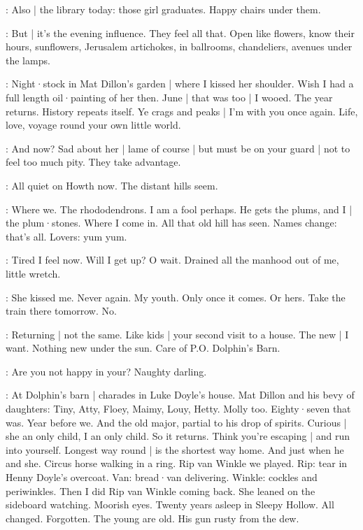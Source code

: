 \BloomToday:
Also |
the library today:
those girl graduates.
Happy chairs under them.

\BloomAbstract:
But |
it's the evening influence.
They feel all that.
Open like flowers,
know their hours,
sunflowers,
Jerusalem artichokes,
in ballrooms,
chandeliers,
avenues under the lamps.%

\BloomHist:
Night·stock in Mat Dillon's garden |
where I kissed her shoulder.
Wish I had a full length oil·painting of her then.
June |
that was too |
I wooed.
The year returns.
History repeats itself.
Ye crags and peaks |
I'm with you once again.
Life,
love,
voyage round your own little world.

\BloomCurrent:
And now?
Sad about her |
lame of course |
but must be on your guard |
not to feel too much pity.
They take advantage.

\BloomCurrent:
All quiet on Howth now.
The distant hills seem.

\BloomHist:
Where we.
The rhododendrons.
I am a fool perhaps.
He gets the plums,
and I |
the plum·stones.
Where I come in.
All that old hill has seen.
Names change:
that's all.%
Lovers:
yum yum.

\BloomCurrent:
Tired I feel now.
Will I get up?
O wait.
Drained all the manhood out of me,
little wretch.

\BloomHist:
She kissed me.
Never again.
My youth.
Only once it comes.
Or hers.
Take the train there tomorrow.
No.

\BloomAbstract:
Returning |
not the same.
Like kids |
your second visit to a house.
The new |
I want.
Nothing new under the sun.
Care of P.O. Dolphin's Barn.

\BloomOther:
Are you not happy in your?
Naughty darling.

\BloomHist:
At Dolphin's barn |
charades in Luke Doyle's house.
Mat Dillon and his bevy of daughters:
Tiny,
Atty,
Floey,
Maimy,
Louy,
Hetty.
Molly too.
Eighty·seven that was.
Year before we.
And the old major,
partial to his drop of spirits.
Curious |
she an only child,
I an only child.
So it returns.
Think you're escaping |
and run into yourself.%
Longest way round |
is the shortest way home.
And just when he and she.
Circus horse
walking in a ring.
Rip van Winkle
we played.
Rip: tear in Henny Doyle's overcoat.
Van: bread·van delivering.
Winkle: cockles and periwinkles.
Then I did Rip van Winkle coming back.
She leaned on the sideboard watching.
Moorish eyes.
Twenty years asleep in Sleepy Hollow.
All changed.
Forgotten.
The young are old.
His gun rusty from the dew.

